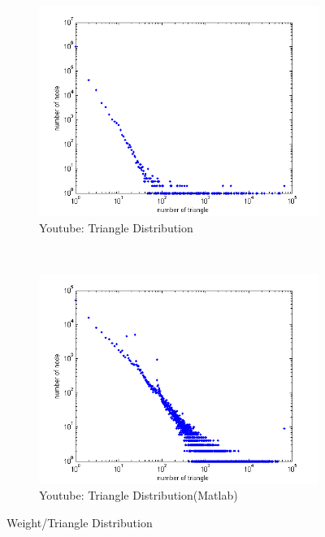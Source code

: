 \begin{figure}
    \centering
    \begin{subfigure}[htbp]{0.8\textwidth}
            \includegraphics[width=\textwidth]{FIG/my_youtube_triangle.png}
            \caption{Youtube: Triangle Distribution}
            \label{fig:my_youtube_triangle}
    \end{subfigure}
    ~ %
    \begin{subfigure}[htbp]{0.8\textwidth}
            \includegraphics[width=\textwidth]{FIG/matlab_youtube_triangle.png}
            \caption{Youtube: Triangle Distribution(Matlab)}
            \label{fig:matlab}
    \end{subfigure}
    \caption{Weight/Triangle Distribution}
        \label{fig:results7}
\end{figure}

